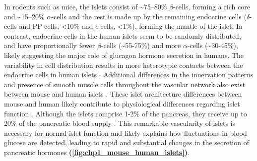 \par In rodents such as mice, the islets consist of \textasciitilde75–80\% $\beta$-cells, forming a rich core and \textasciitilde15–20\% $\alpha$-cells and the rest is made up by the remaining endocrine cells ($\delta$-cells and PP-cells, <10\% and $\epsilon$-cells, <1\%), forming the mantle of the islet. In contrast, endocrine cells in the human islets seem to be randomly distributed, and have proportionally fewer $\beta$-cells (\textasciitilde55-75\%) and more $\alpha$-cells (\textasciitilde30-45\%), likely suggesting the major role of glucagon hormone secretion in humans. The variability in cell distribution results in more heterotypic contacts between the endocrine cells in human islets \textbf{\cite{walker_human_2021}}. Additional differences in the innervation patterns and presence of smooth muscle cells throughout the vascular network also exist between mouse and human islets \textbf{\cite{rodriguez-diaz_autonomic_2011}}. These islet architecture differences between mouse and human likely contribute to physiological differences regarding islet function \textbf{\cite{cabrera_unique_2006}}. Although the islets comprise 1-2\% of the pancreas, they receive up to 20\% of the pancreatic blood supply \textbf{\cite{muratore_vascular_2021,jansson_glucose-induced_1986}}. This remarkable vascularity of islets is necessary for normal islet function and likely explains how fluctuations in blood glucose are detected, leading to rapid and substantial changes in the secretion of pancreatic hormones \textbf{(\autoref{fig:chp1_mouse_human_islets})}.\\

